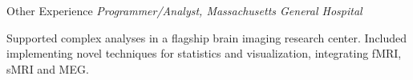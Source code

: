 \begin{rubric}{Other Experience}
\entry*[2002] \emph{Programmer/Analyst, Massachusetts General Hospital}
    \par Supported complex analyses in a flagship brain imaging research center.
    Included implementing novel techniques for statistics and visualization,
    integrating fMRI, sMRI and MEG.

\end{rubric}

